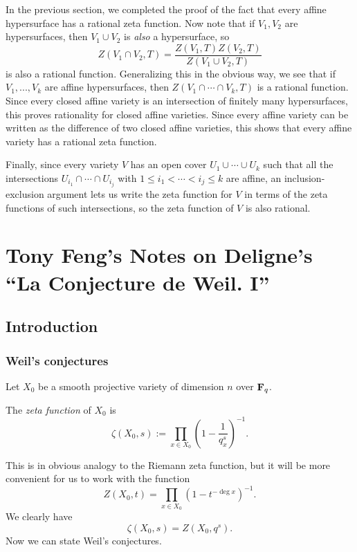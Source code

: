 In the previous section, we completed the proof of the fact that every affine hypersurface has a rational zeta function. Now note that if $V_1, V_2$ are hypersurfaces, then $V_1 \cup V_2$ is \emph{also} a hypersurface, so
\[
Z(V_1\cap V_2, T) = \frac{Z(V_1,T)Z(V_2,T)}{Z(V_1\cup V_2,T)}
\]
is also a rational function. Generalizing this in the obvious way, we see that if $V_1, ..., V_k$ are affine hypersurfaces, then $Z(V_1 \cap \cdots \cap V_k, T)$ is a rational function. Since every closed affine variety is an intersection of finitely many hypersurfaces, this proves rationality for closed affine varieties. Since every affine variety can be written as the difference of two closed affine varieties, this shows that every affine variety has a rational zeta function.

Finally, since every variety $V$ has an open cover $U_1 \cup \cdots \cup U_k$ such that all the intersections $U_{i_1} \cap \cdots \cap U_{i_j}$ with $1 \le i_1 < \cdots < i_j \le k$ are affine, an inclusion-exclusion argument lets us write the zeta function for $V$ in terms of the zeta functions of such intersections, so the zeta function of $V$ is also rational.





\section{Tony Feng's Notes on Deligne's ``La Conjecture de Weil. I''}

\subsection{Introduction}


\subsubsection{Weil's conjectures}
Let $X_0$ be a smooth projective variety of dimension $n$ over $\mathbf{F}_q$. 

\begin{defn}
The \emph{zeta function} of $X_0$ is
\[
\zeta(X_0,s) := \prod_{x \in X_0} \left(1-\frac{1}{q_x^s}\right)^{-1}.
\]
\end{defn}

This is in obvious analogy to the Riemann zeta function, but it will be more convenient for us to work with the function
\[
Z(X_0, t) = \prod_{x \in X_0} \left( 1 - t^{-\deg x} \right)^{-1}.
\]
We clearly have 
\[
\zeta(X_0,s) =Z(X_0,q^s). 
\]
Now we can state Weil's conjectures. 


